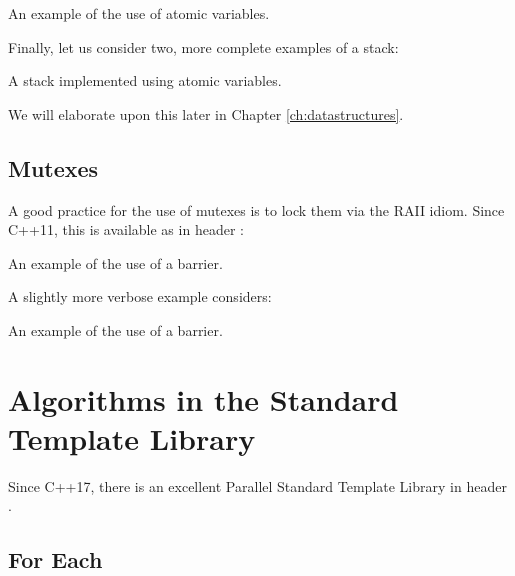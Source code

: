 \begin{itemize}
\begin{end}
\raggedbottom
\begin{codebox}[]{\href{https://godbolt.org/z/}{\ExternalLink}}
\footnotesize An example of the use of atomic variables.
\tcblower
{}
\end{codebox}

Finally, let us consider two, more complete examples of a stack:

\raggedbottom
\begin{codebox}[]{\href{https://godbolt.org/z/}{\ExternalLink}}
\footnotesize A stack implemented using atomic variables.
\tcblower
{}
\end{codebox}

We will elaborate upon this later in Chapter \ref{ch:datastructures}. 

\subsection{Mutexes}

A good practice for the use of mutexes is to lock them via the RAII idiom. Since C++11, this is available as  in header :

\raggedbottom
\begin{codebox}[]{\href{https://godbolt.org/z/}{\ExternalLink}}
\footnotesize An example of the use of a barrier.
\tcblower
{}
\end{codebox}

A slightly more verbose example considers:

\raggedbottom
\begin{codebox}[]{\href{https://godbolt.org/z/}{\ExternalLink}}
\footnotesize An example of the use of a barrier.
\tcblower
{}
\end{codebox}

\section{Algorithms in the Standard Template Library}

Since C++17, there is an excellent Parallel Standard Template Library in header .

\subsection{For Each}
\label{sec:foreachcpp23}


\end{end}
\end{itemize}
